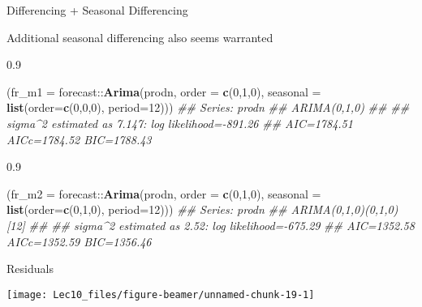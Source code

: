 \documentclass[11pt,ignorenonframetext,]{beamer}
\newenvironment{Shaded}{}{}
\newcommand{\CommentTok}[1]{\textcolor[rgb]{0.38,0.63,0.69}{\textit{#1}}}
\newcommand{\DataTypeTok}[1]{\textcolor[rgb]{0.56,0.13,0.00}{#1}}
\newcommand{\DecValTok}[1]{\textcolor[rgb]{0.25,0.63,0.44}{#1}}
\newcommand{\KeywordTok}[1]{\textcolor[rgb]{0.00,0.44,0.13}{\textbf{#1}}}
\newcommand{\NormalTok}[1]{#1}
\newcommand{\OperatorTok}[1]{\textcolor[rgb]{0.40,0.40,0.40}{#1}}
\let\oldShaded\Shaded
\let\endoldShaded\endShaded
\renewenvironment{Shaded}{\footnotesize\begin{spacing}{0.9}\oldShaded}{\endoldShaded\end{spacing}}
\begin{document}
\begin{frame}[fragile]{Differencing + Seasonal Differencing}
\protect\hypertarget{differencing-seasonal-differencing}{}

Additional seasonal differencing also seems warranted

\begin{Shaded}
\begin{Highlighting}[]
\NormalTok{(}\DataTypeTok{fr_m1 =}\NormalTok{ forecast}\OperatorTok{::}\KeywordTok{Arima}\NormalTok{(prodn, }\DataTypeTok{order =} \KeywordTok{c}\NormalTok{(}\DecValTok{0}\NormalTok{,}\DecValTok{1}\NormalTok{,}\DecValTok{0}\NormalTok{), }
            \DataTypeTok{seasonal =} \KeywordTok{list}\NormalTok{(}\DataTypeTok{order=}\KeywordTok{c}\NormalTok{(}\DecValTok{0}\NormalTok{,}\DecValTok{0}\NormalTok{,}\DecValTok{0}\NormalTok{), }\DataTypeTok{period=}\DecValTok{12}\NormalTok{)))}
\CommentTok{## Series: prodn }
\CommentTok{## ARIMA(0,1,0) }
\CommentTok{## }
\CommentTok{## sigma^2 estimated as 7.147:  log likelihood=-891.26}
\CommentTok{## AIC=1784.51   AICc=1784.52   BIC=1788.43}
\end{Highlighting}
\end{Shaded}

\begin{Shaded}
\begin{Highlighting}[]
\NormalTok{(}\DataTypeTok{fr_m2 =}\NormalTok{ forecast}\OperatorTok{::}\KeywordTok{Arima}\NormalTok{(prodn, }\DataTypeTok{order =} \KeywordTok{c}\NormalTok{(}\DecValTok{0}\NormalTok{,}\DecValTok{1}\NormalTok{,}\DecValTok{0}\NormalTok{), }
            \DataTypeTok{seasonal =} \KeywordTok{list}\NormalTok{(}\DataTypeTok{order=}\KeywordTok{c}\NormalTok{(}\DecValTok{0}\NormalTok{,}\DecValTok{1}\NormalTok{,}\DecValTok{0}\NormalTok{), }\DataTypeTok{period=}\DecValTok{12}\NormalTok{)))}
\CommentTok{## Series: prodn }
\CommentTok{## ARIMA(0,1,0)(0,1,0)[12] }
\CommentTok{## }
\CommentTok{## sigma^2 estimated as 2.52:  log likelihood=-675.29}
\CommentTok{## AIC=1352.58   AICc=1352.59   BIC=1356.46}
\end{Highlighting}
\end{Shaded}

\end{frame}

\begin{frame}{Residuals}
\protect\hypertarget{residuals-1}{}

\begin{center}\texttt{[image: Lec10\_files/figure-beamer/unnamed-chunk-19-1]} \end{center}

\end{frame}
\end{document}
